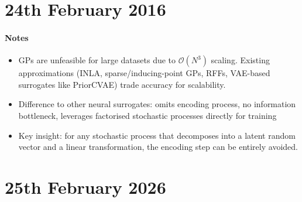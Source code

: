 \documentclass[12pt,a4paper,twoside]{article}
\begin{document}
\section{24th February 2016}

\begin{paper}[
	papertitle={DeepRV: Accelerating spatiotemporal inference with pre-trained neural priors~\cite{Navott2025}},
	authors={Navott et al.},
	summary={DeepRV is a decoder-only neural surrogate that replaces GP prior sampling in MCMC.}
]
	\tcblower
	\paragraph{Notes}
	\begin{itemize}
		\item GPs are unfeasible for large datasets due to $\mathcal{O}(N^3)$ scaling. Existing approximations (INLA, sparse/inducing-point GPs, RFFs, VAE-based surrogates like PriorCVAE) trade accuracy for scalability.
		\item Difference to other neural surrogates: omits encoding process, no information bottleneck, leverages factorised stochastic processes directly for training
		\item Key insight: for any stochastic process that decomposes into a latent random vector and a linear transformation, the encoding step can be entirely avoided.
	\end{itemize}
\end{paper}

\section{25th February 2026}
\end{document}
